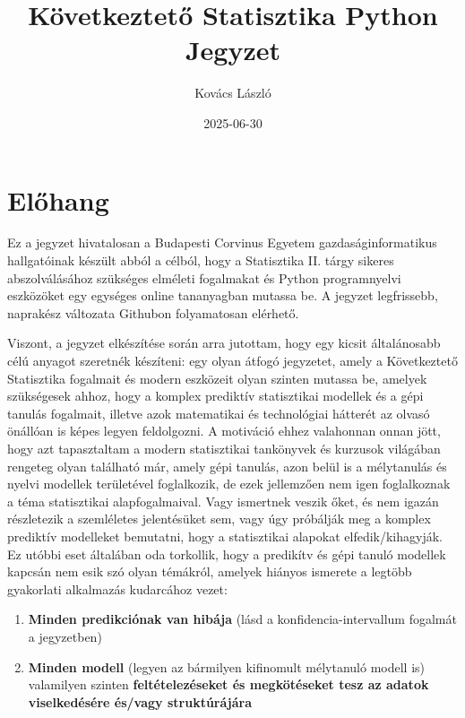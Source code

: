 \documentclass[
]{book}
\title{Következtető Statisztika Python Jegyzet}
\author{Kovács László}
\date{2025-06-30}
\providecommand{\tightlist}{%
  \setlength{\itemsep}{0pt}\setlength{\parskip}{0pt}}
\let\oldmaketitle\maketitle
\begin{document}
\maketitle


\newpage

\let\maketitle\oldmaketitle
\maketitle

{
\setcounter{tocdepth}{1}
\tableofcontents
}
\chapter{Előhang}\label{elux151hang}

Ez a jegyzet hivatalosan a Budapesti Corvinus Egyetem gazdaságinformatikus hallgatóinak készült abból a célból, hogy a Statisztika II. tárgy sikeres abszolválásához szükséges elméleti fogalmakat és Python programnyelvi eszközöket egy egységes online tananyagban mutassa be. A jegyzet legfrissebb, naprakész változata Githubon folyamatosan elérhető.

Viszont, a jegyzet elkészítése során arra jutottam, hogy egy kicsit általánosabb célú anyagot szeretnék készíteni: egy olyan átfogó jegyzetet, amely a Következtető Statisztika fogalmait és modern eszközeit olyan szinten mutassa be, amelyek szükségesek ahhoz, hogy a komplex prediktív statisztikai modellek és a gépi tanulás fogalmait, illetve azok matematikai és technológiai hátterét az olvasó önállóan is képes legyen feldolgozni.
A motiváció ehhez valahonnan onnan jött, hogy azt tapasztaltam a modern statisztikai tankönyvek és kurzusok világában rengeteg olyan található már, amely gépi tanulás, azon belül is a mélytanulás és nyelvi modellek területével foglalkozik, de ezek jellemzően nem igen foglalkoznak a téma statisztikai alapfogalmaival. Vagy ismertnek veszik őket, és nem igazán részletezik a szemléletes jelentésüket sem, vagy úgy próbálják meg a komplex prediktív modelleket bemutatni, hogy a statisztikai alapokat elfedik/kihagyják. Ez utóbbi eset általában oda torkollik, hogy a predikítv és gépi tanuló modellek kapcsán nem esik szó olyan témákról, amelyek hiányos ismerete a legtöbb gyakorlati alkalmazás kudarcához vezet:

\begin{enumerate}
\def\labelenumi{\arabic{enumi}.}
\tightlist
\item
  \textbf{Minden predikciónak van hibája} (lásd a konfidencia-intervallum fogalmát a jegyzetben)
\item
  \textbf{Minden modell} (legyen az bármilyen kifinomult mélytanuló modell is) valamilyen szinten \textbf{feltételezéseket és megkötéseket tesz az adatok viselkedésére és/vagy struktúrájára}
\end{enumerate}
\end{document}
